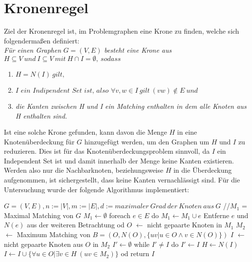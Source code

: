 \section{Kronenregel}
\label{ch:Grundlagen:sec:Kronenregel}
Ziel der Kronenregel ist, im Problemgraphen eine Krone zu finden, welche sich folgendermaßen definiert:\\
\textit{Für einen Graphen} $G=(V,E)$ \textit{besteht eine Krone aus} $H \subseteq V\ und\ I \subseteq V\ mit\ H \cap I = \emptyset,\ sodass$ 
\begin{enumerate}
\item $H = N(I)\ gilt,$ 
\item $\textit{I ein Indipendent Set ist, also }\forall v, w \in I\ gilt\ (vw) \notin E\ und$
\item \textit{die Kanten zwischen H und I ein Matching enthalten in dem alle Knoten aus H enthalten sind.}
\end{enumerate}
Ist eine solche Krone gefunden, kann davon die Menge $H$ in eine Knotenüberdeckung für $G$ hinzugefügt werden, um den Graphen um $H$ und $I$ zu reduzieren. Dies ist für das Knotenüberdeckungsproblem sinnvoll, da $I$ ein Independent Set ist und damit innerhalb der Menge keine Kanten existieren. Werden also nur die Nachbarknoten, beziehungsweise $H$ in die Überdeckung aufgenommen, ist sichergestellt, dass keine Kanten vernachlässigt sind. Für die Untersuchung wurde der folgende Algorithmus \cite{diss} implementiert:
\begin{singlespace}
\begin{algorithm}[caption={Kronenregel.}, label={alg2}]
$G = (V, E), n:= |V|, m:=|E|, d:= maximaler\ Grad\ der\ Knoten\ aus\ G$
//$M_{1}$ = Maximal Matching von $G$
$M_{1} \leftarrow \emptyset$
foreach $e \in E$ do
  $M_{1} \leftarrow M_{1} \cup e$
  Entferne $e$ und $N(e)$ aus der weiteren Betrachtung
od
$O$ $\leftarrow$ nicht gepaarte Knoten in $M_{1}$
$M_{2}$ $\leftarrow$ Maximum Matching von $B = (O, N(O), \{ uv| u \in O \wedge v \in N(O)\}) $
$I$ $\leftarrow$ nicht gepaarte Knoten aus $O$ in $M_{2}$
$I'  \leftarrow \emptyset$
while $I' \neq I$ do
  $I' \leftarrow I$
  $H \leftarrow N(I)$
  $I \leftarrow I \cup \{\forall u \in O|\exists v\in H\ (uv \in M_{2})\}$
od
return $I$
\end{algorithm}
\end{singlespace}
